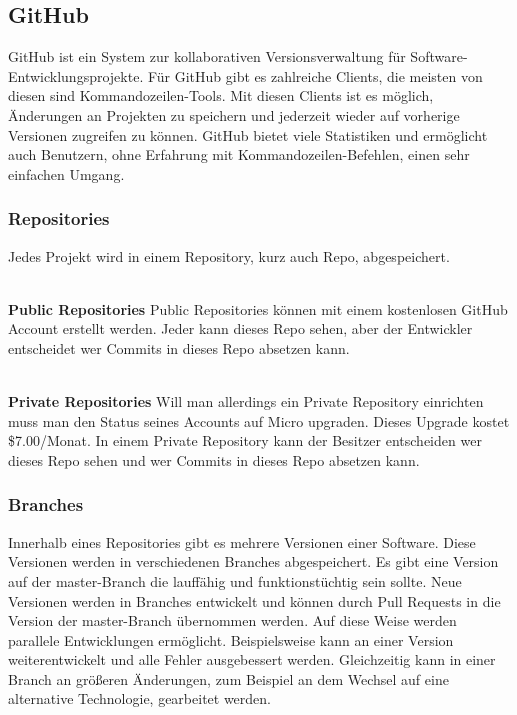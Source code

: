 \documentclass[FIPLY_base.tex]{subfiles}
\author{Andreas Denkmayr}
\date{13. März 2016}
\begin{document}
\subsection{GitHub}
GitHub ist ein System zur kollaborativen Versionsverwaltung für Software-Entwicklungsprojekte.
Für GitHub gibt es zahlreiche Clients, die meisten von diesen sind Kommandozeilen-Tools.
Mit diesen Clients ist es möglich, Änderungen an Projekten zu speichern und jederzeit wieder auf vorherige Versionen zugreifen zu können.
GitHub bietet viele Statistiken und ermöglicht auch Benutzern, ohne Erfahrung mit Kommandozeilen-Befehlen, einen sehr einfachen Umgang. 

\subsubsection{Repositories}
Jedes Projekt wird in einem Repository, kurz auch Repo, abgespeichert.

\ \\
\textbf{Public Repositories}
Public Repositories können mit einem kostenlosen GitHub Account erstellt werden.
Jeder kann dieses Repo sehen, aber der Entwickler entscheidet wer Commits in dieses Repo absetzen kann.

\ \\
\textbf{Private Repositories}
Will man allerdings ein Private Repository einrichten muss man den Status seines Accounts auf Micro upgraden.
Dieses Upgrade kostet \$7.00/Monat. In einem Private Repository kann der Besitzer entscheiden wer dieses Repo sehen und wer Commits in dieses Repo absetzen kann.

\subsubsection{Branches}
Innerhalb eines Repositories gibt es mehrere Versionen einer Software. Diese Versionen werden in verschiedenen Branches abgespeichert.
Es gibt eine Version auf der master-Branch die lauffähig und funktionstüchtig sein sollte.
Neue Versionen werden in Branches entwickelt und können durch Pull Requests in die Version der master-Branch übernommen werden. 
Auf diese Weise werden parallele Entwicklungen ermöglicht. Beispielsweise kann an einer Version weiterentwickelt und alle Fehler ausgebessert werden.
Gleichzeitig kann in einer Branch an größeren Änderungen, zum Beispiel an dem Wechsel auf eine alternative Technologie, gearbeitet werden.
\end{document}

